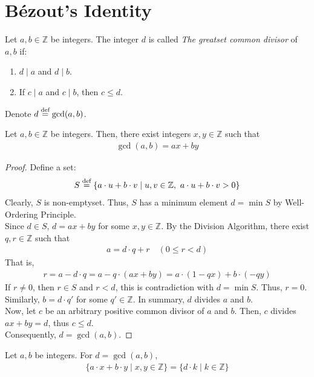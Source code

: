 \newpage
\section{Bézout's Identity}
\begin{definition}
    Let $a,b \in \mathbb{Z}$ be integers. The integer $d$ is called \textit{The greatset common divisor} of $a, b$ if:
    \begin{enumerate}
        \item $d \mid a$ and $d \mid b$.
        \item If $c \mid a$ and $c \mid b$, then $c \leq d$.
    \end{enumerate}
    Denote $d \overset{\textnormal{def}}{=} \gcd(a,b)$.
\end{definition}

\begin{theorem}
    Let $a,b \in \mathbb{Z}$ be integers. Then, there exist integers $x, y \in \mathbb{Z}$ such that
    \begin{align*}
        \gcd(a,b) = ax + by
    \end{align*}
\end{theorem}
\begin{proof}
    Define a set:
    \begin{align*}
        S \overset{\textnormal{def}}{=} \{a \cdot u + b \cdot v \mid u,v \in \mathbb{Z},\ a \cdot u + b \cdot v > 0\}
    \end{align*}
    Clearly, $S$ is non-emptyset. Thus, $S$ has a minimum element $d = \min S$ by Well-Ordering Principle. \\
    Since $d \in S$, $d = ax + by$ for some $x,y \in \mathbb{Z}$. By the Division Algorithm, there exist $q, r \in \mathbb{Z}$ such that
    \begin{align*}
        a = d \cdot q + r \quad(0 \leq r < d)
    \end{align*}
    That is,
    \begin{align*}
        r = a - d \cdot q = a - q \cdot (ax + by) = a \cdot (1 - qx) + b \cdot (-qy)
    \end{align*}
    If $r \neq 0$, then $r \in S$ and $r < d$, this is contradiction with $d = \min S$. Thus, $r = 0$. \\
    Similarly, $b = d \cdot q'$ for some $q' \in \mathbb{Z}$. In summary, $d$ divides $a$ and $b$. \\
    Now, let $c$ be an arbitrary positive common divisor of $a$ and $b$.
    Then, $c$ divides $ax + by = d$, thus $c \leq d$. \\
    Consequently, $d = \gcd(a,b)$.
\end{proof}
\begin{corollary}
    Let $a,b$ be integers. For $d = \gcd(a,b)$,
    \begin{align*}
        \{a \cdot x + b \cdot y \mid x, y \in \mathbb{Z}\} = \{d \cdot k \mid k \in \mathbb{Z}\}
    \end{align*}
\end{corollary}

